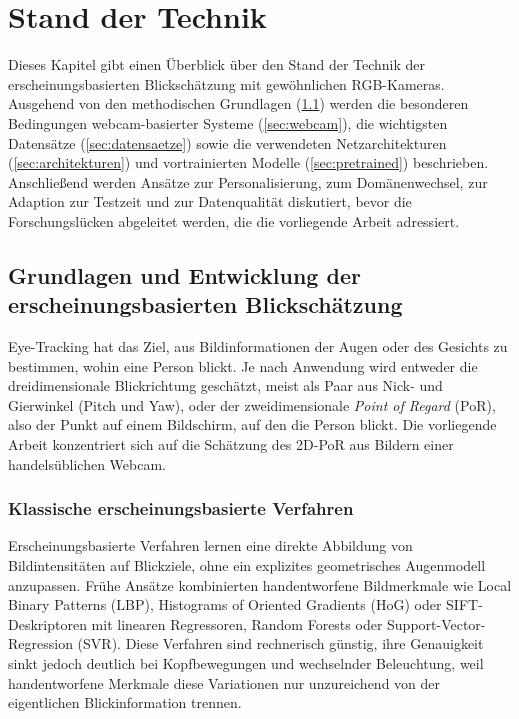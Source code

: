 \documentclass[
  11pt,
  a4paper,
  oneside,
  DIV=12,                 %
  BCOR=8mm,               %
  parskip=half,           %
  headings=normal,
  bibliography=totoc,     %
  listof=totoc            %
]{scrreprt}
\begin{document}
\tableofcontents

\setcounter{chapter}{1}

\chapter{Stand der Technik}
\label{ch:sota}

Dieses Kapitel gibt einen Überblick über den Stand der Technik der erscheinungsbasierten Blickschätzung mit gewöhnlichen RGB-Kameras. Ausgehend von den methodischen Grundlagen (\cref{sec:grundlagen}) werden die besonderen Bedingungen webcam-basierter Systeme (\cref{sec:webcam}), die wichtigsten Datensätze (\cref{sec:datensaetze}) sowie die verwendeten Netzarchitekturen (\cref{sec:architekturen}) und vortrainierten Modelle (\cref{sec:pretrained}) beschrieben. Anschließend werden Ansätze zur Personalisierung, zum Domänenwechsel, zur Adaption zur Testzeit und zur Datenqualität diskutiert, bevor die Forschungslücken abgeleitet werden, die die vorliegende Arbeit adressiert.

\section{Grundlagen und Entwicklung der erscheinungsbasierten Blickschätzung}
\label{sec:grundlagen}
Eye-Tracking hat das Ziel, aus Bildinformationen der Augen oder des Gesichts zu bestimmen, wohin eine Person blickt. Je nach Anwendung wird entweder die dreidimensionale Blickrichtung geschätzt, meist als Paar aus Nick- und Gierwinkel (Pitch und Yaw), oder der zweidimensionale \emph{Point of Regard} (PoR), also der Punkt auf einem Bildschirm, auf den die Person blickt. Die vorliegende Arbeit konzentriert sich auf die Schätzung des 2D-PoR aus Bildern einer handelsüblichen Webcam.

\subsection{Klassische erscheinungsbasierte Verfahren}
\label{subsec:klassisch}
Erscheinungsbasierte Verfahren lernen eine direkte Abbildung von Bildintensitäten auf Blickziele, ohne ein explizites geometrisches Augenmodell anzupassen. Frühe Ansätze kombinierten handentworfene Bildmerkmale wie Local Binary Patterns (LBP), Histograms of Oriented Gradients (HoG) oder SIFT-Deskriptoren mit linearen Regressoren, Random Forests oder Support-Vector-Regression (SVR). Diese Verfahren sind rechnerisch günstig, ihre Genauigkeit sinkt jedoch deutlich bei Kopfbewegungen und wechselnder Beleuchtung, weil handentworfene Merkmale diese Variationen nur unzureichend von der eigentlichen Blickinformation trennen.
\end{document}
